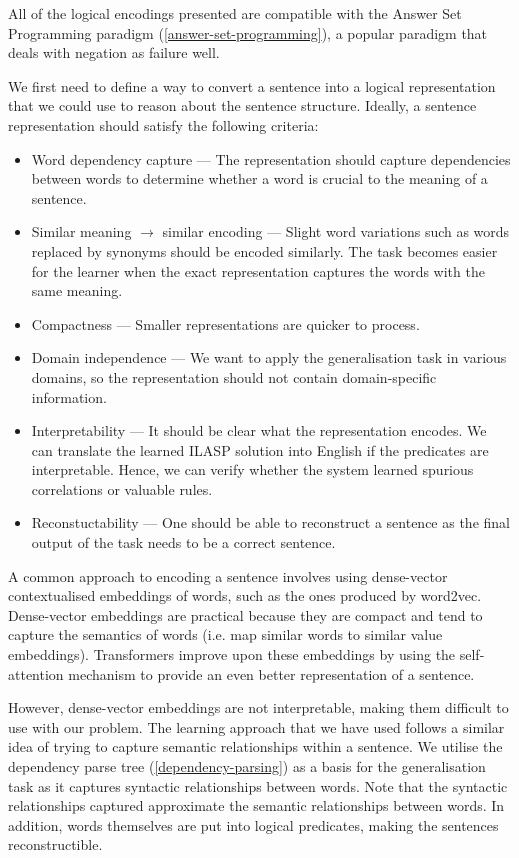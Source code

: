 All of the logical encodings presented are compatible with the Answer Set Programming paradigm (\ref{answer-set-programming}), a popular paradigm that deals with negation as failure well.

We first need to define a way to convert a sentence into a logical representation that we could use to reason about the sentence structure.
Ideally, a sentence representation should satisfy the following criteria:
\begin{itemize}
    \item Word dependency capture --- The representation should capture dependencies between words to determine whether a word is crucial to the meaning of a sentence.
    \item Similar meaning $\rightarrow$ similar encoding --- Slight word variations such as words replaced by synonyms should be encoded similarly. The task becomes easier for the learner when the exact representation captures the words with the same meaning.
    \item Compactness --- Smaller representations are quicker to process. 
    \item Domain independence --- We want to apply the generalisation task in various domains, so the representation should not contain domain-specific information.
    \item Interpretability --- It should be clear what the representation encodes. We can translate the learned ILASP solution into English if the predicates are interpretable. Hence, we can verify whether the system learned spurious correlations or valuable rules.
    \item Reconstuctability --- One should be able to reconstruct a sentence as the final output of the task needs to be a correct sentence.
\end{itemize}


A common approach to encoding a sentence involves using dense-vector contextualised embeddings of words, such as the ones produced by word2vec.
Dense-vector embeddings are practical because they are compact and tend to capture the semantics of words (i.e. map similar words to similar value embeddings).
Transformers improve upon these embeddings by using the self-attention mechanism to provide an even better representation of a sentence.

However, dense-vector embeddings are not interpretable, making them difficult to use with our problem. 
The learning approach that we have used follows a similar idea of trying to capture semantic relationships within a sentence.
We utilise the dependency parse tree (\ref{dependency-parsing}) as a basis for the generalisation task as it captures syntactic relationships between words.
Note that the syntactic relationships captured approximate the semantic relationships between words.
In addition, words themselves are put into logical predicates, making the sentences reconstructible.

